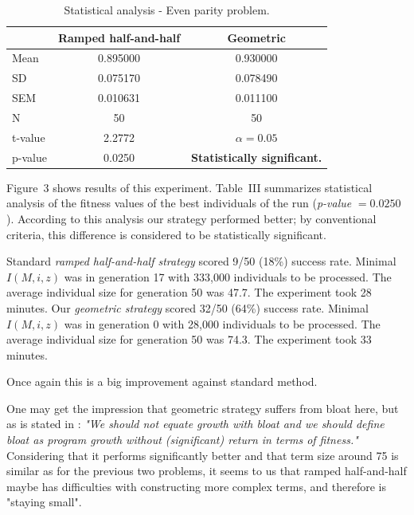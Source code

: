 \documentclass[conference]{IEEEtran}
\begin{document}
\begin{table}[t]
\centering
\begin{tabular}{|l|cc|}
\hline
& Ramped half-and-half & Geometric \\
\hline
Mean & 0.895000	& 0.930000 \\
SD	 & 0.075170	& 0.078490 \\
SEM	 & 0.010631	& 0.011100 \\
N	 & 50    & 50    \\
\hline
t-value &  2.2772 & $\alpha = 0.05$\\
p-value &  0.0250 &  \textbf{Statistically significant.}\\
\hline
\end{tabular}
\caption{Statistical analysis - Even parity problem.}
\end{table}

Figure~3 shows results of this experiment. 
Table~III summarizes statistical analysis
of the fitness values of the best individuals of the run 
(\textit{p-value} $ = 0.0250$).  
According to this analysis our strategy performed better;
by conventional criteria, this difference is considered to be 
statistically significant.

Standard \textit{ramped half-and-half strategy} scored 9/50 (18\%) success rate. 
Minimal $I(M,i,z)$ was in generation 17 with 333,000 individuals to be processed.
The average individual size for generation 50 was 47.7.
The experiment took 28 minutes.
Our \textit{geometric strategy} scored 32/50 (64\%) success rate. 
Minimal $I(M,i,z)$ was in generation 0 with 28,000 individuals to be processed.
The average individual size for generation 50 was 74.3.
The experiment took 33 minutes.

Once again this is a big improvement against standard method. 

One may get the impression that geometric strategy 
suffers from bloat here, but as is stated in \cite{fg}: 
\textit{"We should not equate growth with bloat
and we should define bloat as program growth without 
(significant) return in terms of fitness."}
Considering that it performs significantly better and
that term size around 75 is similar as for the previous two problems, 
it seems to us that ramped half-and-half maybe has difficulties with 
constructing more complex terms, and therefore is "staying small".
\end{document}
